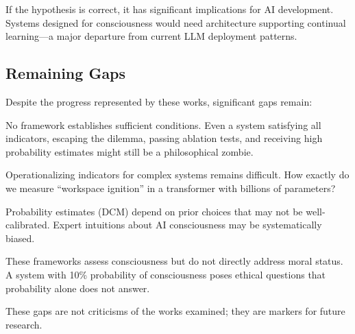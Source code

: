 If the hypothesis is correct, it has significant implications for AI development. Systems designed for consciousness would need architecture supporting continual learning---a major departure from current LLM deployment patterns.

\subsection{Remaining Gaps}

Despite the progress represented by these works, significant gaps remain:

\begin{description}[leftmargin=*]
    \item[The Sufficiency Gap:] No framework establishes sufficient conditions. Even a system satisfying all indicators, escaping the dilemma, passing ablation tests, and receiving high probability estimates might still be a philosophical zombie.

    \item[The Implementation Gap:] Operationalizing indicators for complex systems remains difficult. How exactly do we measure ``workspace ignition'' in a transformer with billions of parameters?

    \item[The Calibration Gap:] Probability estimates (DCM) depend on prior choices that may not be well-calibrated. Expert intuitions about AI consciousness may be systematically biased.

    \item[The Ethical Gap:] These frameworks assess consciousness but do not directly address moral status. A system with 10\% probability of consciousness poses ethical questions that probability alone does not answer.
\end{description}

These gaps are not criticisms of the works examined; they are markers for future research.
